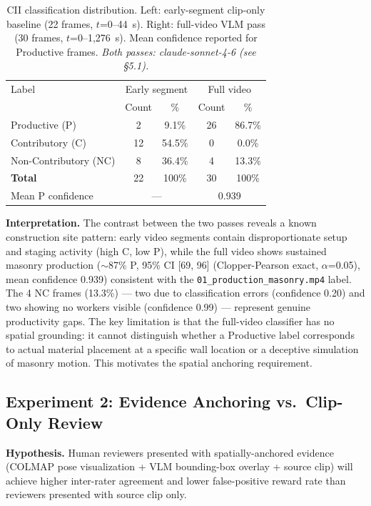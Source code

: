\documentclass[sigconf,nonacm]{acmart}
\begin{document}
\begin{table}[h]
\centering
\caption{CII classification distribution. Left: early-segment clip-only
baseline (22 frames, $t$=0--44~s). Right: full-video VLM pass (30 frames,
$t$=0--1,276~s). Mean confidence reported for Productive frames.
\emph{Both passes: claude-sonnet-4-6 (see \S5.1).}}
\begin{tabular}{lcccc}
\toprule
Label & \multicolumn{2}{c}{Early segment} & \multicolumn{2}{c}{Full video} \\
      & Count & \% & Count & \% \\
\midrule
Productive (P)       & 2  & 9.1\%  & 26 & 86.7\% \\
Contributory (C)     & 12 & 54.5\% & 0  & 0.0\%  \\
Non-Contributory (NC)& 8  & 36.4\% & 4  & 13.3\% \\
\midrule
\textbf{Total}       & 22 & 100\%  & 30 & 100\%  \\
Mean P confidence    & \multicolumn{2}{c}{---} & \multicolumn{2}{c}{0.939} \\
\bottomrule
\end{tabular}
\label{tab:cii}
\end{table}

\textbf{Interpretation.} The contrast between the two passes reveals a
known construction site pattern: early video segments contain disproportionate
setup and staging activity (high C, low P), while the full video shows
sustained masonry production ($\sim$87\% P, 95\% CI [69, 96] (Clopper-Pearson exact, $\alpha$=0.05), mean confidence
0.939) consistent with the \texttt{01\_production\_masonry.mp4} label. The
4 NC frames (13.3\%) --- two due to classification errors (confidence 0.20)
and two showing no workers visible (confidence 0.99) --- represent genuine
productivity gaps. The key limitation is that the full-video classifier has no
spatial grounding: it cannot distinguish whether a Productive label corresponds
to actual material placement at a specific wall location or a deceptive
simulation of masonry motion. This motivates the spatial anchoring requirement.

\subsection{Experiment 2: Evidence Anchoring vs.\ Clip-Only Review}
\label{sec:exp2}

\textbf{Hypothesis.} Human reviewers presented with spatially-anchored evidence
(COLMAP pose visualization + VLM bounding-box overlay + source clip) will
achieve higher inter-rater agreement and lower false-positive reward rate than
reviewers presented with source clip only.
\end{document}
